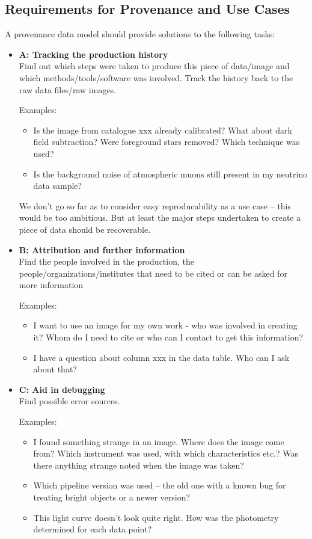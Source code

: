 \documentclass[11pt,a4paper]{ivoa}
\begin{document}
\subsection{Requirements for Provenance and Use Cases}
A provenance data model should provide solutions to the following tasks:
\begin{itemize}
\item   \textbf{A: Tracking the production history}\\
		Find out which steps were taken to produce this piece of data/image and which methods/tools/software was involved. 
		Track the history back to the raw data files/raw images.

		Examples: 
		\begin{itemize}
			\item Is the image from catalogue xxx already calibrated?
What about dark field subtraction? Were foreground stars removed? Which technique
was used?  
			
			\item Is the background noise of atmospheric muons still present in my neutrino data sample?  
		\end{itemize}

		We don't go so far as to consider easy reproducability as a use case -- this would be too ambitious. But at least the 
		major steps undertaken to create a piece of data should be recoverable.

	  

	\item   \textbf{B: Attribution and further information}\\
		Find the people involved in the production, the people/organizations/institutes that need to be cited or can be asked for more information

		Examples: 
		\begin{itemize}
			\item I want to use an image for my own work - who was involved in
creating it? Whom do I need to cite or who can I contact to get this information?  
			\item I have a question about column xxx in the data
table. Who can I ask about that?  
		\end{itemize}
	  

	\item   \textbf{C: Aid in debugging}\\
		Find possible error sources.

		Examples: 
		\begin{itemize}
			\item I found something strange in an image. Where does
the image come from? Which instrument was used, with which characteristics
etc.? Was there anything strange noted when the image was taken?  
			\item Which pipeline version was used -- the old one
with a known bug for treating bright objects or a newer version?  
			\item This light curve doesn't look quite right. How was
the photometry determined for each data point?  
		\end{itemize}


\end{itemize}
\end{document}
